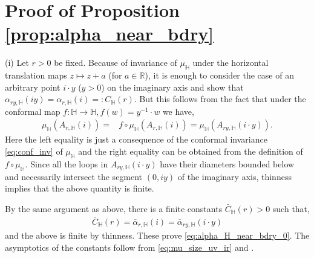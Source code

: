 \documentclass[a4paper, 11pt, reqno]{amsart}
\theoremstyle{definition} \newtheorem{defn}{Definition}[section]
\theoremstyle{remark} \newtheorem{rem}[defn]{Remark}
\theoremstyle{remark} \newtheorem*{rem*}{Remark}
\theoremstyle{plain} \newtheorem{thm}[defn]{Theorem}
\theoremstyle{plain} \newtheorem{lem}[defn]{Lemma}
\theoremstyle{plain} \newtheorem{prop}[defn]{Proposition}
\theoremstyle{plain} \newtheorem{cor}[defn]{Corollary}
\theoremstyle{remark} \newtheorem{exm}[defn]{\textbf{Example}}
\theoremstyle{remark} \newtheorem{exms}[defn]{\textbf{Examples}}
\theoremstyle{remark} \newtheorem*{bl}{}
\numberwithin{equation}{section} %
\newcommand{\R}{\mathbb{R}}
\newcommand{\bH}{\mathbb{H}}
\begin{document}
    \appendix

    \section{Proof of Proposition \ref{prop:alpha_near_bdry}}\label{app:proof_prop:alpha_near_bdry}

              
        (i) Let $r>0$ be fixed. Because of invariance of $\mu_{\bH}$ under the horizontal translation maps $z \mapsto z+ a$ (for $a \in \R$), it is enough to consider the case of an arbitrary point $i\cdot y$ ($y >0$) on the imaginary axis and show that $\alpha_{ry, \bH}(i y) = \alpha_{r, \bH}(i)= : C_{\bH}(r)$. But this follows from the fact that under the conformal map $f : \bH \to \bH, f(w) = y^{-1}\cdot w$ we have,
        \begin{align}
            \mu_{\bH}(A_{r, \bH} (i)) = & f\circ \mu_{\bH} (A_{r, \bH} (i)) = \mu_{\bH} (A_{ry, \bH} (i\cdot y)).    
        \end{align}
        Here the left equality is just a consequence of the conformal invariance \eqref{eq:conf_inv} of $\mu_{\bH}$ and the right equality can be obtained from the definition of $f \circ \mu_{\bH}$. Since all the loops in $A_{ry, \bH} (i\cdot y)$ have their diameters bounded below and necessarily intersect the segment $(0, iy)$ of the imaginary axis, thinness implies that the above quantity is finite. 

        By the same argument as above, there is a finite constants $\bar{C}_{\bH}(r)>0$ such that, 
        \begin{align}\label{eq:alpha_H_near_bdry}
           \bar{C}_{\bH}(r) =\bar{\alpha}_{r, \bH}(i) =  \bar{\alpha}_{ry, \bH}(i\cdot y)
        \end{align}
        and the above is finite by thinness. These prove \eqref{eq:alpha_H_near_bdry_0}. The asymptotics of the constants follow from \eqref{eq:mu_size_uv_ir} and \cite[Corollary 3]{nw11}.
\end{document}
